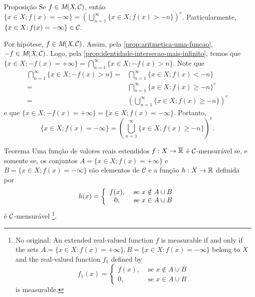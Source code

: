     \begin{env}{Proposição}
    \label{prop:identidade-união-menos-infinito}
        Se $f \in \operatorname{\textit{M}(\textit{X}, \mathcal{C} )}$, então $\{x \in X; f(x) = -\infty\} = \displaystyle \left(\bigcup_{n = 1}^\infty \{x \in X; f(x) > - n\}\right)^c$.
        Particularmente, $\{x \in X; f(x) = -\infty\} \in \operatorname{\mathcal{C}}$.
        \vspace{-0.4cm}
    \end{env}
    \begin{prova}
    	Por hipótese, $f \in \operatorname{\textit{M}(\textit{X}, \mathcal{C} )}$.
    	Assim, pela \ref{prop:aritmetica-uma-funcao}, 
    	$-f \in \operatorname{\textit{M}(\textit{X}, \mathcal{C} )}$.
    	Logo, pela \ref{prop:identidade-intersecao-mais-infinito}, temos que 
    	$\{x \in X; -f(x) = +\infty\} = \displaystyle \bigcap_{n = 1}^\infty \{x \in X; -f(x) > n\}$.
    	Note que 
        \begin{align*}
            \bigcap_{n = 1}^\infty \{x \in X; -f(x) > n\}
            =& \bigcap_{n = 1}^\infty \{x \in X; f(x) < -n\}\\
            =& \bigcap_{n = 1}^\infty \{x \in X; f(x) \geq -n\}^c\\
            =& \left(\bigcup_{n = 1}^\infty \{x \in X; f(x) \geq -n\}\right)^c 
        \end{align*}
    	e que $\{x \in X; -f(x) = +\infty\} = \{x \in X; f(x) = -\infty\}$. Portanto, 
    	$$
    	\{x \in X; f(x) = -\infty\} 
    	= 
    	\displaystyle \left(\bigcup_{n = 1}^\infty \{x \in X; f(x) \geq -n\}\right)^c.$$
    \end{prova}
    \begin{env}{Teorema}
    \label{teo:condição-de-mensurabilidade}
        Uma função de valores reais estendidos $f: X \to \operatorname{\overline{\mathbb{R}}}$ é $\operatorname{\mathcal{C}}$-mensurável se, e somente se, os conjuntos 
        $A = \{ x \in X; f(x) = +\infty\}$ e $B = \{x \in X; f(x) = -\infty\}$
		 são elementos de $\mathcal{C}$ e a função $h: X \to \mathbb{R}$ definida por
		 \vspace{-0.2cm}
		 $$
		 h(x) = \left\{\begin{array}{cc}
		     f(x), & \textrm{\ se } x \notin A\cup B  \\
		      0,& \textrm{\ se } x \in A\cup B
		 \end{array}\right.
	 	 \vspace{-0.2cm}
		 $$
		 é $\operatorname{\mathcal{C}}$-mensurável \cite[p.11, tradução nossa, adaptação nossa]{bartle}
		 \footnote{No original: An extended real-valued function $f$ is measurable if and
		 	only if the sets
		 	$A = \{x \in X : f(x) = +\infty\}, B = \{x \in X : f(x) = -\infty\}$
		 	belong to $X$ and the real-valued function $f_1$ defined by
		 	$$f_1(x) = \left\{\begin{array}{cc}
		 		f(x), & \textrm{\ se } x \notin A\cup B  \\
		 		0,& \textrm{\ se } x \in A\cup B
		 	\end{array}\right.$$
		 is measurable.}.
		 \vspace{-0.2cm}
	 \end{env}
